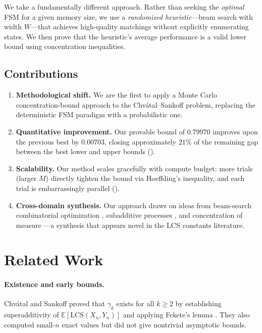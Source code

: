 \documentclass[11pt,a4paper]{article}
\theoremstyle{definition}
\newcommand{\E}{\mathbb{E}}
\newcommand{\LCS}{\mathrm{LCS}}
\begin{document}
We take a fundamentally different approach. Rather than seeking the
\emph{optimal} FSM for a given memory size, we use a \emph{randomized
heuristic}---beam search with width $W$---that achieves high-quality matchings
without explicitly enumerating states. We then prove that the heuristic's
average performance is a valid lower bound using concentration inequalities.

\subsection{Contributions}

\begin{enumerate}
  \item \textbf{Methodological shift.} We are the first to apply a Monte Carlo
    concentration-bound approach to the Chv\'{a}tal--Sankoff problem, replacing
    the deterministic FSM paradigm with a probabilistic one.

  \item \textbf{Quantitative improvement.} Our provable bound of $0.79970$
    improves upon the previous best \citep{heineman2024} by $0.00703$, closing
    approximately $21\%$ of the remaining gap between the best lower and upper
    bounds ().

  \item \textbf{Scalability.} Our method scales gracefully with compute budget:
    more trials (larger $M$) directly tighten the bound via Hoeffding's
    inequality, and each trial is embarrassingly parallel
    ().

  \item \textbf{Cross-domain synthesis.} Our approach draws on ideas from
    beam-search combinatorial optimization \citep{huber2021}, subadditive
    processes \citep{kingman1968}, and concentration of measure
    \citep{hoeffding1963}---a synthesis that appears novel in the LCS constants
    literature.
\end{enumerate}

\section{Related Work}
\label{sec:related}

\paragraph{Existence and early bounds.}
Chv\'{a}tal and Sankoff \citep{chvtal1975} proved that $\gamma_k$ exists for all
$k \geq 2$ by establishing superadditivity of $\E[\LCS(X_n, Y_n)]$ and applying
Fekete's lemma \citep{fekete1923}. They also computed small-$n$ exact values
but did not give nontrivial asymptotic bounds.
\end{document}

